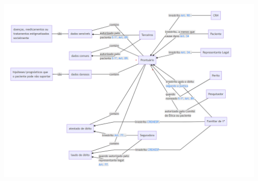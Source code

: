 \documentclass[a4paper,11pt]{article}
\begin{document}
{\color{RoyalBlue}

\includegraphics[width=\textwidth]{images/taxonomia-de-permissoes.png}

}
\end{document}
